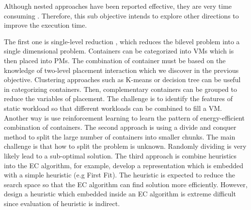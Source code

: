 \begin{enumerate}
	 Although nested approaches have been reported effective, they are very time consuming \cite{Sinha:2017et}. Therefore, this sub objective intends to explore other directions to improve the execution time. 

	 The first one is single-level reduction \cite{Sinha:2017et}, which reduces the bilevel problem into a single dimensional problem. Containers can be categorized into VMs which is then placed into PMs. The combination of container must be based on the knowledge of two-level placement interaction which we discover in the previous objective. Clustering approaches such as K-means \cite{Xie:2011fj} or decision tree can be useful in categorizing containers. Then, complementary containers can be grouped to reduce the variables of placement. The challenge is to identify the features of static workload so that different workloads can be combined to fill a VM. Another way is use reinforcement learning to learn the pattern of energy-efficient combination of containers. 
	The second approach is using a divide and conquer method to split the large number of containers into smaller chunks. The main challenge is that how to split the problem is unknown. Randomly dividing is very likely lead to a sub-optimal solution.
	The third approach is combine heuristics into the EC algorithm, for example, develop a representation which is embedded with a simple heuristic (e.g First Fit). The heuristic is expected to reduce the search space so that the EC algorithm can find solution more efficiently. However, design a heuristic which embedded inside an EC algorithm is extreme difficult since evaluation of heuristic is indirect. 

\end{enumerate}
